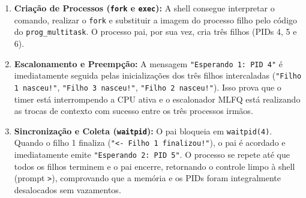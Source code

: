 \begin{enumerate}
    \item \textbf{Criação de Processos (\texttt{fork} e \texttt{exec}):} A shell
    consegue interpretar o comando, realizar o \texttt{fork} e substituir a imagem
    do processo filho pelo código do \texttt{prog\_multitask}. O processo pai, por sua 
    vez, cria três filhos (PIDs 4, 5 e 6).
    
    \item \textbf{Escalonamento e Preempção:} A mensagem \texttt{"Esperando 1: PID 4"} 
    é imediatamente seguida pelas inicializações dos três filhos intercaladas 
    (\texttt{"Filho 1 nasceu!"}, \texttt{"Filho 3 nasceu!"}, \texttt{"Filho 2 nasceu!"}). 
    Isso prova que o timer está interrompendo a CPU ativa e o escalonador MLFQ 
    está realizando as trocas de contexto com sucesso entre os três processos irmãos.
    
    \item \textbf{Sincronização e Coleta (\texttt{waitpid}):} O pai bloqueia em 
    \texttt{waitpid(4)}. Quando o filho 1 finaliza (\texttt{"<- Filho 1 finalizou!"}), 
    o pai é acordado e imediatamente emite \texttt{"Esperando 2: PID 5"}. O processo se repete
    até que todos os filhos terminem e o pai encerre, retornando o controle limpo
    à shell (prompt \texttt{>}), comprovando que a memória e os PIDs foram
    integralmente desalocados sem vazamentos.
\end{enumerate}
